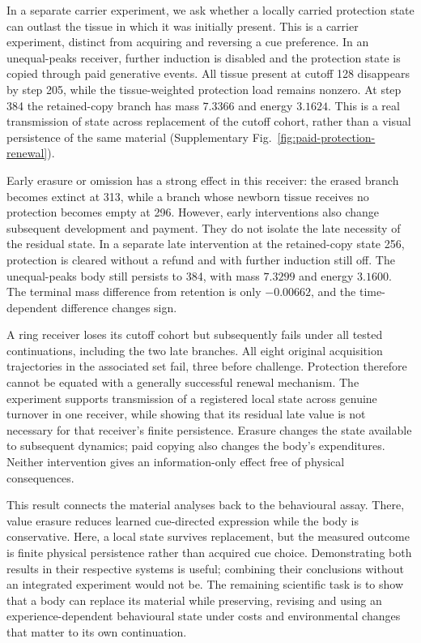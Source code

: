 In a separate carrier experiment, we ask whether a locally carried protection state can outlast the tissue in which it was initially present. This is a carrier experiment, distinct from acquiring and reversing a cue preference. In an unequal-peaks receiver, further induction is disabled and the protection state is copied through paid generative events. All tissue present at cutoff 128 disappears by step 205, while the tissue-weighted protection load remains nonzero. At step 384 the retained-copy branch has mass $7.3366$ and energy $3.1624$. This is a real transmission of state across replacement of the cutoff cohort, rather than a visual persistence of the same material (Supplementary Fig.~\ref{fig:paid-protection-renewal}).

Early erasure or omission has a strong effect in this receiver: the erased branch becomes extinct at 313, while a branch whose newborn tissue receives no protection becomes empty at 296. However, early interventions also change subsequent development and payment. They do not isolate the late necessity of the residual state. In a separate late intervention at the retained-copy state 256, protection is cleared without a refund and with further induction still off. The unequal-peaks body still persists to 384, with mass $7.3299$ and energy $3.1600$. The terminal mass difference from retention is only $-0.00662$, and the time-dependent difference changes sign.



A ring receiver loses its cutoff cohort but subsequently fails under all tested continuations, including the two late branches. All eight original acquisition trajectories in the associated set fail, three before challenge. Protection therefore cannot be equated with a generally successful renewal mechanism. The experiment supports transmission of a registered local state across genuine turnover in one receiver, while showing that its residual late value is not necessary for that receiver's finite persistence. Erasure changes the state available to subsequent dynamics; paid copying also changes the body's expenditures. Neither intervention gives an information-only effect free of physical consequences.

This result connects the material analyses back to the behavioural assay. There, value erasure reduces learned cue-directed expression while the body is conservative. Here, a local state survives replacement, but the measured outcome is finite physical persistence rather than acquired cue choice. Demonstrating both results in their respective systems is useful; combining their conclusions without an integrated experiment would not be. The remaining scientific task is to show that a body can replace its material while preserving, revising and using an experience-dependent behavioural state under costs and environmental changes that matter to its own continuation.


